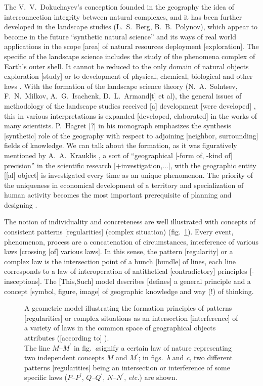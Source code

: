 \documentclass[12pt,leqno]{book}
\begin{document}
The V.~V.~Dokuchayev's conception founded in the geography the idea of interconnection integrity between natural complexes, and it has been further developed in the landscape studies (L.~S.~Berg, B.~B.~Polynov), which appear to become in the future ``synthetic natural science'' and its ways of real world applications in the scope [area] of natural resources deployment [exploration]. The specific of the landscape science includes the study of the phenomena complex of Earth's outer shell. It cannot be reduced to the only domain of natural objects exploration [study] or to development of physical, chemical, biological and other laws \cite{b285}. With the formation of the landscape science theory (N.~A.~Solntsev, F.~N.~Milkov, A.~G.~Isachenk, D.~L.~Armand[t] et al), the general issues of methodology of the landscape studies received [a] development [were developed] \cite{b288}, this in various interpretations is expanded [developed, elaborated] in the works of many scientists. P.~Hagret [?] in his monograph \cite{b450}  emphasizes the synthesis [synthetic] role of the geography with respect to adjoining [neighbor, surrounding] fields of knowledge. We can talk about the formation, as it was figuratively mentioned by A.~A.~Krauklis \cite[p.~206]{b227}, a sort of ``geographical [-form of, -kind of] precision'' in the scientific research [+investigation,...], with the geographic entity [[al] object] is investigated every time as an unique phenomenon. The priority of the uniqueness in economical development of a territory and specialization of human activity becomes the most important prerequisite of planning and designing \cite{b351}.

The notion of individuality and concreteness are well illustrated with concepts of consistent patterns [regularities] (complex situation) (fig.~\ref{fig:1}). Every event, phenomenon, process are a concatenation of circumstances, interference of various laws [crossing [of] various laws]. In this sense, the pattern [regularity] or a complex law is the intersection point of a bunch [bundle] of lines, each line corresponds to a law of interoperation of antithetical [contradictory] principles [-insceptions]. The [This,Such] model describes [defines] a general principle and a concept [symbol, figure, image] of geographic knowledge and way (!) of thinking.

\begin{figure}[tbhp] \label{fig:1}
\vspace{1em}
\caption{A geometric model illustrating the formation principles of patterns [regularities] or complex situations as an intersection [interference] of a variety of laws in the common space of geographical objects attributes ([according to] \cite{b24}). \protect\\\small{} The line $M\mbox{--}M^\prime{}$ in fig.~\emph{a}signify a certain law of nature representing two independent concepts $M$ and $M^\prime{}$; in figs.~\emph{b} and \emph{c}, two different patterns [regularities] being an intersection or interference of some specific laws ($P\mbox{--}P^\prime{}$, $Q\mbox{--}Q^\prime{}$, $N\mbox{--}N^\prime{}$, \emph{etc.}) are shown.  }
\end{figure}
\end{document}
